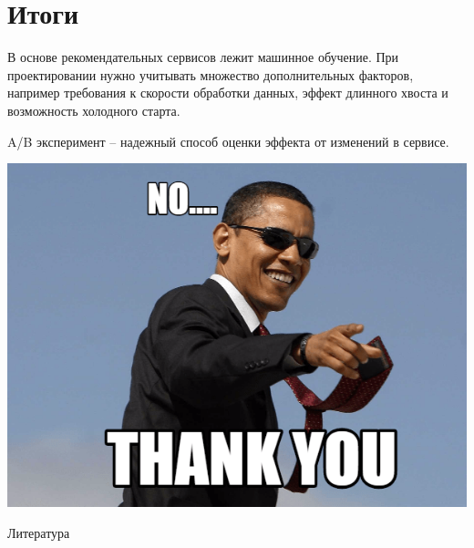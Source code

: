 \documentclass[11pt,aspectratio=169,handout]{beamer}
\begin{document}
\section{Итоги}

\begin{frame}

\begin{tcolorbox}[colback=info!5,colframe=info!80]
В основе рекомендательных сервисов лежит машинное обучение. При проектировании  нужно учитывать множество дополнительных факторов, например требования к скорости обработки данных, эффект длинного хвоста и возможность холодного старта.
\end{tcolorbox}
\vfill
\begin{tcolorbox}[colback=info!5,colframe=info!80]
A/B эксперимент -- надежный способ оценки эффекта от изменений в сервисе.
\end{tcolorbox}

\end{frame}

\begin{frame}
\begin{center}
\includegraphics[scale=0.5]{images/thanks.png}
\end{center}
\end{frame}

\begin{frame}[allowframebreaks]{Литература}


\end{frame}
\end{document}
